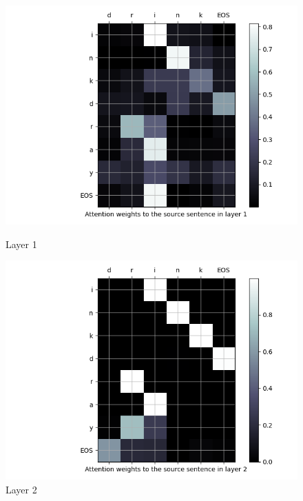 \begin{enumarabic}
    \begin{figure}[H]
      \centering
      \begin{minipage}[b]{0.33\textwidth}
        \centering
        \includegraphics[width=\textwidth]{figures/drink-0.png}
        \caption{Layer 1}
        \label{fig:drink-0}
      \end{minipage}
      \hfill
      \begin{minipage}[b]{0.33\textwidth}
        \centering
        \includegraphics[width=\textwidth]{figures/drink-1.png}
        \caption{Layer 2}
        \label{fig:drink-1}
      \end{minipage}
      \begin{minipage}[b]{0.33\textwidth}

\end{minipage}
\end{figure}
\end{enumarabic}
